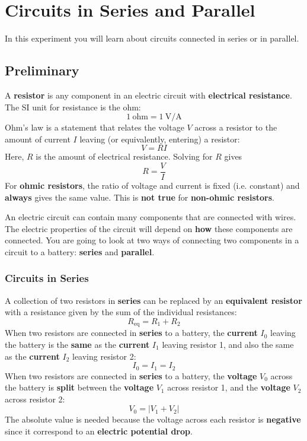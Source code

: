 \setcounter{chapter}{2}
\chapter{Circuits in Series and Parallel}
%
In this experiment you will learn about circuits connected in series or in parallel.
%
\section{Preliminary}
%
A \textbf{resistor} is any component in an electric circuit with \textbf{electrical resistance}. The SI unit for resistance is the ohm:
\begin{equation}
	1 \ \text{ohm} = 1 \ \text{V/A}
\end{equation}
Ohm's law is a statement that relates the voltage $V$ across a resistor to the amount of current $I$ leaving (or equivalently, entering) a resistor:
\begin{equation}
	V = R I
\end{equation}
Here, $R$ is the amount of electrical resistance. Solving for $R$ gives
\begin{equation} \label{eq.03.ROhmLaw}
	R = \frac{V}{I}
\end{equation}
For \textbf{ohmic resistors}, the ratio of voltage and current is fixed (i.e. constant) and \textbf{always} gives the same value. This is \textbf{not true} for \textbf{non-ohmic resistors}.

An electric circuit can contain many components that are connected with wires. The electric properties of the circuit will depend on \textbf{how} these components are connected. You are going to look at two ways of connecting two components in a circuit to a battery: \textbf{series} and \textbf{parallel}.
%
\subsection{Circuits in Series}
%
A collection of two resistors in \textbf{series} can be replaced by an \textbf{equivalent resistor} with a resistance given by the sum of the individual resistances:
\begin{equation} \label{eq.03.RSeries}
	R_{\text{eq}} = R_{1} + R_{2}
\end{equation}
When two resistors are connected in \textbf{series} to a battery, the \textbf{current} $I_{0}$ leaving the battery is the \textbf{same} as the \textbf{current} $I_{1}$ leaving resistor 1, and also the same as the \textbf{current} $I_{2}$ leaving resistor 2:
\begin{equation} \label{eq.03.ISeries}
	I_{0} = I_{1} = I_{2}
\end{equation}
When two resistors are connected in \textbf{series} to a battery, the \textbf{voltage} $V_{0}$ across the battery is \textbf{split} between the \textbf{voltage} $V_{1}$ across resistor 1, and the \textbf{voltage} $V_{2}$ across resistor 2:
\begin{equation} \label{eq.03.VSeries}
	V_{0} = \left| V_{1} + V_{2} \right|
\end{equation}
The absolute value is needed because the voltage across each resistor is \textbf{negative} since it correspond to an \textbf{electric potential drop}.
%
